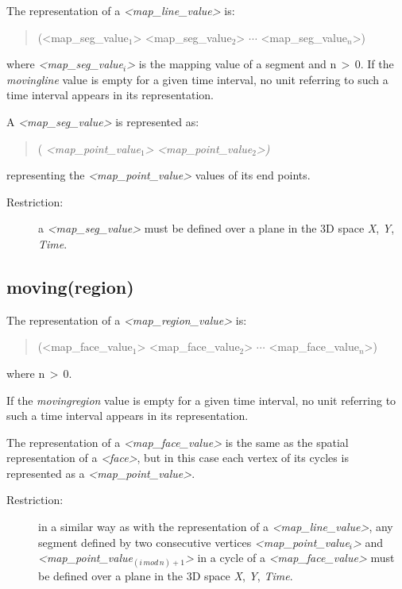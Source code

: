 \documentclass[english,a4paper]{article}
\begin{document}
The representation of a \emph{<map\_line\_value>} is:

\begin{quotation}
(<map\_seg\_value$_{1}$> <map\_seg\_value$_{2}$> $\cdots $ <map\_seg\_value$_{n}$>)
\end{quotation}
where \emph{<map\_seg\_value$_{i}$>} is the mapping value of a segment
and n$\, >\, $0. If the \emph{movingline} value is empty for a given
time interval, no unit referring to such a time interval appears in
its representation.

A \emph{<map\_seg\_value>} is represented as:

\begin{quotation}
( \emph{<map\_point\_value$_{1}$>} \emph{<map\_point\_value$_{2}$>)}
\end{quotation}
representing the \emph{<map\_point\_value>} values of its end points.

\begin{description}
\item [Restriction:]a \emph{<map\_seg\_value>} must be defined over a plane
in the 3D space \emph{X}, \emph{Y}, \emph{Time}.
\end{description}

\subsection{moving(region)}

The representation of a \emph{<map\_region\_value>} is:

\begin{quotation}
(<map\_face\_value$_{1}$> <map\_face\_value$_{2}$> $\cdots $ <map\_face\_value$_{n}$>)
\end{quotation}
where n$\, >\, $0.

If the \emph{movingregion} value is empty for a given time interval,
no unit referring to such a time interval appears in its representation.

The representation of a \emph{<map\_face\_value>} is the same as the
spatial representation of a \emph{<face>}, but in this case each vertex
of its cycles is represented as a \emph{<map\_point\_value>}.

\begin{description}
\item [Restriction:]in a similar way as with the representation of a \emph{<map\_line\_value>},
any segment defined by two consecutive vertices \emph{<map\_point\_value$_{i}$>}
and \emph{<map\_point\_value$_{(i\, mod\, n)+1}$>} in a cycle of
a \emph{<map\_face\_value>} must be defined over a plane in the 3D
space \emph{X}, \emph{Y}, \emph{Time}.\end{description}
\end{document}
